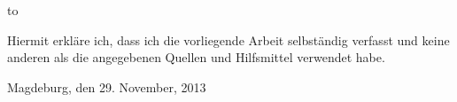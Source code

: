 \thispagestyle{empty}
\vspace*{38\baselineskip}
\hbox to \textwidth{\hrulefill}
\par
Hiermit erkl\"are ich, dass ich die vorliegende Arbeit selbst\"andig verfasst und
keine anderen als die angegebenen Quellen und Hilfsmittel verwendet habe.

Magdeburg, den 29. November, 2013

\clearpage
